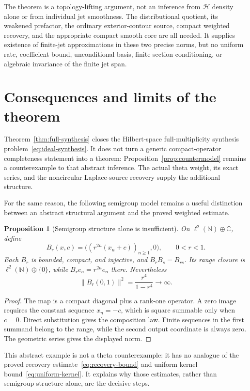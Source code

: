 \documentclass[11pt,a4paper]{article}
\numberwithin{equation}{section}
\newtheorem{proposition}[theorem]{Proposition}
\theoremstyle{definition}
\theoremstyle{remark}
\newcommand{\C}{\mathbb C}
\newcommand{\Hh}{\mathcal H}
\newcommand{\norm}[1]{\lVert #1\rVert}
\begin{document}
The theorem is a topology-lifting argument, not an inference from $\Hh$ density alone or from individual jet smoothness. The distributional quotient, its weakened prefactor, the ordinary exterior-contour source, compact weighted recovery, and the appropriate compact smooth core are all needed. It supplies existence of finite-jet approximations in these two precise norms, but no uniform rate, coefficient bound, unconditional basis, finite-section conditioning, or algebraic invariance of the finite jet span.

\section{Consequences and limits of the theorem}\label{sec:limits}

Theorem~\ref{thm:full-synthesis} closes the Hilbert-space full-multiplicity synthesis problem~\eqref{eq:ideal-synthesis}. It does not turn a generic compact-operator completeness statement into a theorem: Proposition~\ref{prop:countermodel} remains a counterexample to that abstract inference. The actual theta weight, its exact series, and the noncircular Laplace-source recovery supply the additional structure.

For the same reason, the following semigroup model remains a useful distinction between an abstract structural argument and the proved weighted estimate.

\begin{proposition}[Semigroup structure alone is insufficient]\label{prop:semigroup-model}
On $\ell^2(\mathbb N)\oplus\C$, define
\[
 B_r(x,c)=\bigl((r^{2n}(x_n+c))_{n\ge1},0\bigr),\qquad 0<r<1.
\]
Each $B_r$ is bounded, compact, and injective, and $B_rB_s=B_{rs}$. Its range closure is $\ell^2(\mathbb N)\oplus\{0\}$, while $B_re_n=r^{2n}e_n$ there. Nevertheless
\[
 \norm{B_r(0,1)}^2=\frac{r^4}{1-r^4}\longrightarrow\infty.
\]
\end{proposition}
\begin{proof}
The map is a compact diagonal plus a rank-one operator. A zero image requires the constant sequence $x_n=-c$, which is square summable only when $c=0$. Direct substitution gives the composition law. Finite sequences in the first summand belong to the range, while the second output coordinate is always zero. The geometric series gives the displayed norm.
\end{proof}

This abstract example is not a theta counterexample: it has no analogue of the proved recovery estimate~\eqref{eq:recovery-bound} and uniform kernel bound~\eqref{eq:uniform-kernel}. It explains why those estimates, rather than semigroup structure alone, are the decisive steps.
\end{document}
